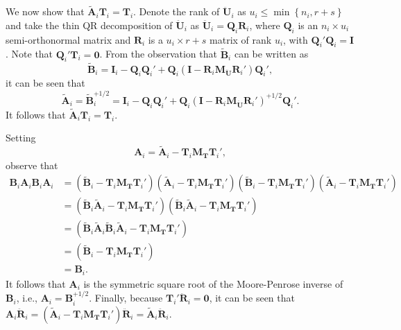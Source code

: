 \documentclass[12pt]{article}
\begin{document}
We now show that \(\tilde{\mathbf{A}}_i \mathbf{T}_i = \mathbf{T}_i\).
Denote the rank of \(\mathbf{\ddot{U}}_i\) as
\(u_i \leq \min \left\{n_i, r + s \right\}\) and take the thin QR
decomposition of \(\mathbf{\ddot{U}}_i\) as
\(\mathbf{\ddot{U}}_i = \mathbf{Q}_i \mathbf{R}_i\), where
\(\mathbf{Q}_i\) is an \(n_i \times u_i\) semi-orthonormal matrix and
\(\mathbf{R}_i\) is a \(u_i \times r + s\) matrix of rank \(u_i\), with
\(\mathbf{Q}_i'\mathbf{Q}_i = \mathbf{I}\). Note that
\(\mathbf{Q}_i'\mathbf{T}_i = \mathbf{0}\). From the observation that
\(\tilde{\mathbf{B}}_i\) can be written as \[
\tilde{\mathbf{B}}_i = \mathbf{I}_i - \mathbf{Q}_i \mathbf{Q}_i' + \mathbf{Q}_i \left(\mathbf{I} - \mathbf{R}_i \mathbf{M}_{\mathbf{\ddot{U}}} \mathbf{R}_i'\right)\mathbf{Q}_i',
\] it can be seen that \begin{equation}
\tilde{\mathbf{A}}_i = \tilde{\mathbf{B}}_i^{+1/2} = \mathbf{I}_i - \mathbf{Q}_i \mathbf{Q}_i' + \mathbf{Q}_i \left(\mathbf{I} - \mathbf{R}_i \mathbf{M}_{\mathbf{\ddot{U}}} \mathbf{R}_i'\right)^{+1/2} \mathbf{Q}_i'.
\end{equation} It follows that
\(\tilde{\mathbf{A}}_i \mathbf{T}_i = \mathbf{T}_i\).

Setting \begin{equation}
\mathbf{A}_i = \tilde{\mathbf{A}}_i - \mathbf{T}_i \mathbf{M_T}\mathbf{T}_i',
\end{equation} observe that \begin{align*}
\mathbf{B}_i \mathbf{A}_i \mathbf{B}_i \mathbf{A}_i &= \left(\tilde{\mathbf{B}}_i - \mathbf{T}_i \mathbf{M_T}\mathbf{T}_i'\right) \left(\tilde{\mathbf{A}}_i - \mathbf{T}_i \mathbf{M_T}\mathbf{T}_i'\right)\left(\tilde{\mathbf{B}}_i - \mathbf{T}_i \mathbf{M_T}\mathbf{T}_i'\right) \left(\tilde{\mathbf{A}}_i - \mathbf{T}_i \mathbf{M_T}\mathbf{T}_i'\right) \\
&= \left(\tilde{\mathbf{B}}_i\tilde{\mathbf{A}}_i - \mathbf{T}_i \mathbf{M_T}\mathbf{T}_i'\right)\left(\tilde{\mathbf{B}}_i\tilde{\mathbf{A}}_i - \mathbf{T}_i \mathbf{M_T}\mathbf{T}_i'\right) \\
&= \left(\tilde{\mathbf{B}}_i\tilde{\mathbf{A}}_i\tilde{\mathbf{B}}_i\tilde{\mathbf{A}}_i - \mathbf{T}_i \mathbf{M_T}\mathbf{T}_i'\right) \\
&= \left(\tilde{\mathbf{B}}_i - \mathbf{T}_i \mathbf{M_T}\mathbf{T}_i'\right) \\
&= \mathbf{B}_i.
\end{align*} It follows that \(\mathbf{A}_i\) is the symmetric square
root of the Moore-Penrose inverse of \(\mathbf{B}_i\), i.e.,
\(\mathbf{A}_i = \mathbf{B}_i^{+1/2}\). Finally, because
\(\mathbf{T}_i ' \mathbf{\ddot{R}}_i= \mathbf{0}\), it can be seen that
\(\mathbf{A}_i \mathbf{\ddot{R}}_i = \left(\tilde{\mathbf{A}}_i - \mathbf{T}_i \mathbf{M_T}\mathbf{T}_i'\right)\mathbf{\ddot{R}}_i = \tilde{\mathbf{A}}_i \mathbf{\ddot{R}}_i\).
\end{document}
